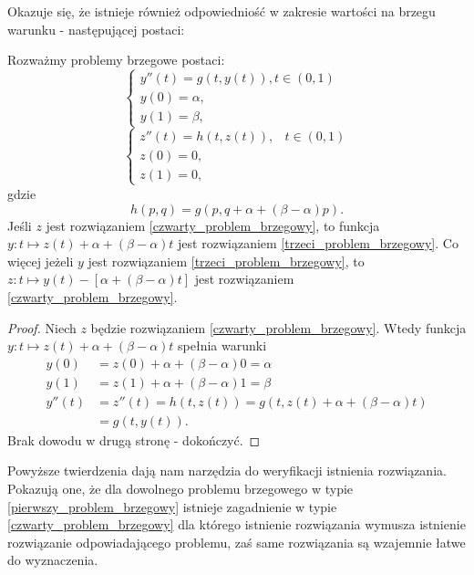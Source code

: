 Okazuje się, że istnieje również odpowiedniość w zakresie wartości na brzegu warunku - następującej postaci:
\begin{theorem}
Rozważmy problemy brzegowe postaci:
\begin{equation}\label{trzeci_problem_brzegowy}
\left\{\begin{array}{ll}
y''(t)=g(t,y(t)), t \in(0,1)& \\
y(0)=\alpha, & \\
y(1)=\beta,
\end{array}\right.
\end{equation}
\begin{equation}\label{czwarty_problem_brzegowy}
\left\{\begin{array}{ll}
z''(t)=h(t,z(t)), & t \in (0,1)\\
z(0)= 0, & \\
z(1)= 0,
\end{array}\right.
\end{equation}
gdzie 
$$
h(p,q)= g(p,q+\alpha + (\beta - \alpha)p).
$$
Jeśli $z$ jest rozwiązaniem \eqref{czwarty_problem_brzegowy}, to funkcja $y: t \mapsto z(t) + \alpha + (\beta - \alpha)t$ jest rozwiązaniem \eqref{trzeci_problem_brzegowy}. Co więcej jeżeli $y$ jest rozwiązaniem \eqref{trzeci_problem_brzegowy}, to $z: t \mapsto y(t) - [\alpha + (\beta - \alpha)t]$ jest rozwiązaniem \eqref{czwarty_problem_brzegowy}.
\end{theorem}
\begin{proof}
Niech $z$ będzie rozwiązaniem \eqref{czwarty_problem_brzegowy}. Wtedy funkcja $y: t \mapsto z(t) + \alpha + (\beta - \alpha)t$ spełnia warunki
\begin{align*}
y(0)&= z(0) + \alpha + (\beta - \alpha)0 = \alpha \\
y(1)&= z(1) + \alpha + (\beta - \alpha)1 = \beta \\
y''(t)&= z''(t) = h(t,z(t)) = g(t,z(t) + \alpha + (\beta - \alpha)t) \\
&= g(t,y(t)).
\end{align*}
{\color{red} Brak dowodu w drugą stronę - dokończyć.}
\end{proof}

Powyższe twierdzenia dają nam narzędzia do weryfikacji istnienia rozwiązania. Pokazują one, że dla dowolnego problemu brzegowego w typie \eqref{pierwszy_problem_brzegowy} istnieje zagadnienie w typie \eqref{czwarty_problem_brzegowy} dla którego istnienie rozwiązania wymusza istnienie rozwiązanie odpowiadającego problemu, zaś same rozwiązania są wzajemnie łatwe do wyznaczenia. 

